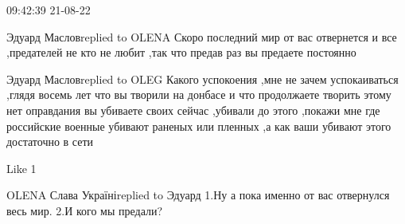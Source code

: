  
 
 
 
 

09:42:39 21-08-22

Эдуард Масловreplied to OLENA
Скоро последний мир от вас отвернется и все ,предателей не кто не любит ,так что предав раз вы предаете постоянно

Эдуард Масловreplied to OLEG
Какого успокоения ,мне не зачем успокаиваться ,глядя восемь лет что вы творили на донбасе и что продолжаете творить этому нет оправдания вы убиваете своих сейчас ,убивали до этого ,покажи мне где российские военные убивают раненых или пленных ,а как ваши убивают этого достаточно в сети

    Like 1

OLENA Слава Україніreplied to Эдуард
1.Ну а пока именно от вас отвернулся весь мир.
2.И кого мы предали?
